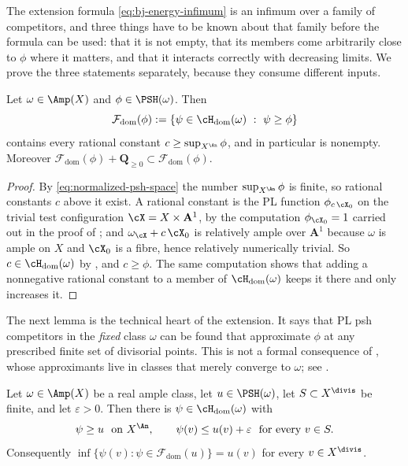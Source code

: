 The extension formula \eqref{eq:bj-energy-infimum} is an infimum over a
family of competitors, and three things have to be known about that family
before the formula can be used: that it is not empty, that its members come
arbitrarily close to $\phi$ where it matters, and that it interacts
correctly with decreasing limits.  We prove the three statements
separately, because they consume different inputs.

\begin{lemma}
\label{lem:ch46-competitors-nonempty}
Let $\omega\in\Amp(X)$ and $\phi\in\PSH(\omega)$.  Then
\[
 \mathcal F_{\mathrm{dom}}(\phi):=
 \{\psi\in\cH_{\mathrm{dom}}(\omega)\ :\ \psi\ge\phi\}
\]
contains every rational constant $c\ge\sup_{X^{\An}}\phi$, and in
particular is nonempty.  Moreover
$\mathcal F_{\mathrm{dom}}(\phi)+\mathbf Q_{\ge0}\subset\mathcal F_{\mathrm{dom}}(\phi)$.
\end{lemma}

\begin{proof}
By \eqref{eq:normalized-psh-space} the number $\sup_{X^{\An}}\phi$ is
finite, so rational constants $c$ above it exist.  A rational constant is
the PL function $\phi_{c\,\cX_0}$ on the trivial test configuration
$\cX=X\times\mathbf A^1$, by the computation $\phi_{\cX_0}=1$ carried
out in the proof of ; and
$\omega_{\cX}+c\,\cX_0$ is relatively ample over $\mathbf A^1$ because
$\omega$ is ample on $X$ and $\cX_0$ is a fibre, hence relatively
numerically trivial.  So $c\in\cH_{\mathrm{dom}}(\omega)$ by
, and $c\ge\phi$.  The same computation shows that
adding a nonnegative rational constant to a member of
$\cH_{\mathrm{dom}}(\omega)$ keeps it there and only increases it.
\end{proof}

The next lemma is the technical heart of the extension.  It says that PL
psh competitors in the \emph{fixed} class $\omega$ can be found that
approximate $\phi$ at any prescribed finite set of divisorial points.
This is not a formal consequence of , whose approximants
live in classes that merely converge to $\omega$; see
.

\begin{lemma}
\label{lem:ch46-pl-domination}
Let $\omega\in\Amp(X)$ be a real ample class, let
$u\in\PSH(\omega)$, let $S\subset X^{\divis}$ be finite, and let
$\varepsilon>0$.  Then there is
$\psi\in\cH_{\mathrm{dom}}(\omega)$ with
\[
 \psi\ge u\ \text{ on }X^{\An},
 \qquad
 \psi(v)\le u(v)+\varepsilon\ \text{ for every }v\in S .
\]
Consequently
$\inf\{\psi(v):\psi\in\mathcal F_{\mathrm{dom}}(u)\}=u(v)$ for every
$v\in X^{\divis}$.
\end{lemma}

